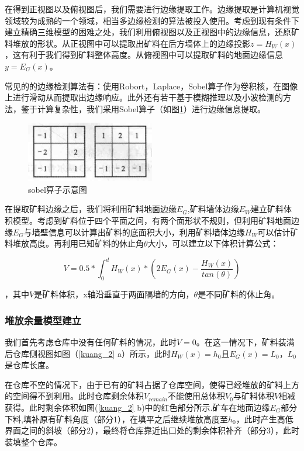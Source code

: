 \documentclass{my_paper}
\begin{document}
    在得到正视图以及俯视图后，我们需要进行边缘提取工作。边缘提取是计算机视觉领域较为成熟的一个领域，相当多边缘检测的算法被投入使用。考虑到现有条件下建立精确三维模型的困难之处，我们利用俯视图以及正视图中的边缘信息，还原矿料堆放的形状。从正视图中可以提取出矿料在后方墙体上的边缘投影$z=H_W(x)$，这有利于我们得到矿料整体高度。从俯视图中可以提取矿料的地面边缘信息$y=E_G(x)$。

    常见的的边缘检测算法\cite{bianyuan}有：使用Robort，Laplace，Sobel算子作为卷积核，在图像上进行滑动从而提取出边缘响应。此外还有若干基于模糊推理以及小波检测的方法，鉴于计算复杂性，我们采用Sobel算子（如图\ref{sobel}）进行边缘信息提取。

    \begin {figure}[h]
    \centering %
    \includegraphics[width=0.5\textwidth]{sobel.png}
    \caption{sobel算子示意图} %
    \label{sobel}
    \end {figure}

    在提取矿料边缘之后，我们将利用矿料地面边缘$E_G$,矿料墙体边缘$E_W$建立矿料体积模型。考虑到矿料位于四个平面之间，有两个面形状不规则，但利用矿料地面边缘$E_G$与墙壁信息可以计算出矿料的底面积大小，利用矿料墙体边缘$H_W$可以估计矿料堆放高度。再利用已知矿料的休止角$\theta$大小，可以建立以下体积计算公式：

    \begin{equation}
        V=0.5*\int_0^d H_W(x)*(2E_G(x)-\frac{H_W(x)}{tan(\theta)})
    \label{}
    \end{equation}

    ，其中$V$是矿料体积，x轴沿垂直于两面隔墙的方向，$\theta$是不同矿料的休止角。


    \subsubsection{堆放余量模型建立}
    
    我们首先考虑仓库中没有任何矿料的情况，此时$V=0$。在这一情况下，矿料装满后仓库侧视图如图（\ref{kuang_2} a）所示，此时$H_W(x)=h_0$且$E_G(x)=L_0$，$L_0$是仓库长度。

    在仓库不空的情况下，由于已有的矿料占据了仓库空间，使得已经堆放的矿料上方的空间得不到利用。此时仓库剩余体积$V_{remain}$不能使用总体积$V_0$与矿料体积$V$相减获得。此时剩余体积如图(\ref{kuang_2} b)中的红色部分所示.矿车在地面边缘$E_G$部分下料,填补原有矿料角度（部分1），在填平之后继续堆放高度至$h_0$，此时产生高低界面之间的斜坡（部分2），最终将仓库靠近出口处的剩余体积补齐（部分3），此时装填整个仓库。
\end{document}
